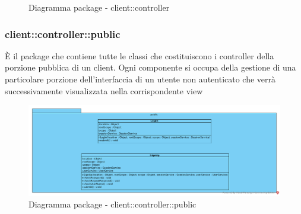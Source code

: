 \begin{center}
\begin{figure}[H]
			\caption{Diagramma package - client::controller}
		\end{figure}
	\end{center}\subsubsection{client::controller::public}
È il package che contiene tutte le classi che costituiscono i controller della porzione pubblica di un client. Ogni componente si occupa della gestione di una particolare porzione dell'interfaccia di un utente non autenticato che verrà successivamente visualizzata nella corrispondente view\begin{center}
		\begin{figure}[H]
			\centering \includegraphics[scale=4, max width=\textwidth, max height=\myheight]{../img/diagrammiClassi/client/controller/public.png}
			\caption{Diagramma package - client::controller::public}
		\end{figure}
	\end{center}\hypertarget{client::controller::public::LogIn}{}
